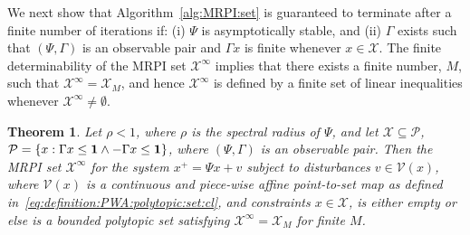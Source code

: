 \documentclass[journal]{IEEEtran}
\newcounter{thmcount}
\newtheorem{thm}[thmcount]{Theorem}
\theoremstyle{remark}
\theoremstyle{definition}
\begin{document}
%
We next show that Algorithm~\ref{alg:MRPI:set} is guaranteed to terminate after a finite number of iterations if:
%
(i) $\Psi$ is asymptotically stable, and 
%
(ii) $\Gamma$ exists such that $(\Psi,\Gamma)$ is an observable pair and $\Gamma x$ is finite whenever $x\in\mathcal{X}$.
%
%
%
The finite determinability of the MRPI set
$\mathcal X^\infty$ implies that there exists a finite number, $M$, such 
that $\mathcal X^\infty = \mathcal X_M$, and hence  $\mathcal{X}^\infty$ is defined by a finite set of linear inequalities whenever $\mathcal X^\infty\neq \emptyset$.
%
%
\begin{thm}\label{thm:finite:MRPI:set:state:dependable}
Let $\rho < 1$, where $\rho$ is the spectral radius of $\Psi$, and let $\mathcal{X}\subseteq\mathcal{P}$, $\mathcal{P}=\{x:\Gamma x\leq{\bf{1}}\wedge 
-\Gamma x\leq{\bf{1}}\}$, where $(\Psi,\Gamma)$ is an observable pair.
%
Then the MRPI set $\mathcal X^\infty$ for the system $x^+ = \Psi x + v$ subject to disturbances $v\in\mathcal{V}(x)$, where $\mathcal V(x)$ is a continuous and piece-wise affine point-to-set map as defined in~\eqref{eq:definition:PWA:polytopic:set:cl}, and constraints $x\in\mathcal{X}$, is either empty or else is a bounded polytopic set satisfying $\mathcal X^\infty =\mathcal X_M$ for finite $M$.
\end{thm}
%
%
\end{document}
